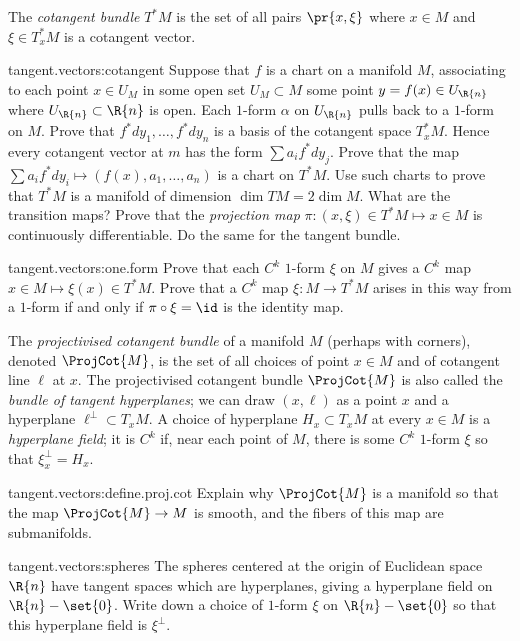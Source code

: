 The \emph{cotangent bundle} \(T^*M\)%
is the set of all pairs \(\pr{x,\xi}\) where \(x \in M\) and \(\xi \in T^*_x M\) is a cotangent vector.
\begin{problem}{tangent.vectors:cotangent}
Suppose that \(f\) is a chart on a manifold \(M\), associating to each point \(x \in U_M\) in some open set \(U_M \subset M\) some point \(y=f(x) \in U_{\R{n}}\) where \(U_{\R{n}} \subset \R{n}\) is open.
Each \(1\)-form \(\alpha\) on \(U_{\R{n}}\) pulls back to a \(1\)-form on \(M\).
Prove that \(f^*dy_1,\dots,f^*dy_n\) is a basis of the cotangent space \(T_x^*M\).
Hence every cotangent vector at \(m\) has the form \(\sum a_i f^*dy_j\).
Prove that the map \(\sum a_i f^*dy_i \mapsto (f(x),a_1,\dots,a_n)\) is a chart on \(T^*M\).
Use such charts to prove that \(T^*M\) is a manifold of dimension \(\dim TM = 2 \dim M\).
What are the transition maps?
Prove that the \emph{projection map}%
\(\pi \colon (x,\xi) \in T^*M \mapsto x \in M\) is continuously differentiable.
Do the same for the tangent bundle.
\end{problem}
\begin{problem}{tangent.vectors:one.form}
Prove that each \(C^k\) \(1\)-form \(\xi\) on \(M\) gives a \(C^k\) map \(x \in M \mapsto \xi(x) \in T^* M\).
Prove that a \(C^k\) map \(\xi \colon M \to T^*M\) arises in this way from a \(1\)-form if and only if \(\pi \circ \xi=\id\) is the identity map.
\end{problem}

The \emph{projectivised cotangent bundle} of a manifold \(M\) (perhaps with corners), denoted \(\ProjCot{M}\), is the set of all choices of point \(x \in M\) and of cotangent line \(\ell\) at \(x\).
The projectivised cotangent bundle \(\ProjCot{M}\) is also called the \emph{bundle of tangent hyperplanes}; we can draw \((x,\ell)\) as a point \(x\) and a hyperplane \(\ell^{\perp} \subset T_x M\).
A choice of hyperplane \(H_x\subset T_x M\) at every \(x\in M\) is a \emph{hyperplane field}; it is \(C^k\) if, near each point of \(M\), there is some \(C^k\) \(1\)-form \(\xi\) so that \(\xi^{\perp}_x=H_x\).
\begin{problem}{tangent.vectors:define.proj.cot} 
Explain why \(\ProjCot{M}\) is a manifold so that the map \(\ProjCot{M} \to M\) is smooth, and the fibers of this map are submanifolds.
\end{problem}
\begin{problem}{tangent.vectors:spheres}
The spheres centered at the origin of Euclidean space \(\R{n}\) have tangent spaces which are hyperplanes, giving a hyperplane field on \(\R{n}-\set{0}\).
Write down a choice of \(1\)-form \(\xi\) on \(\R{n}-\set{0}\) so that this hyperplane field is \(\xi^{\perp}\).
\end{problem}
